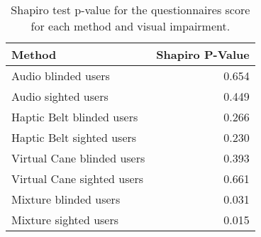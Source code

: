 
\begin{table}[!htb]
\centering
\caption{Shapiro test p-value for the questionnaires score for each method and visual impairment.}
\label{tab:shapiro_questionnaires}
\begin{tabular}{lr}
\toprule
                    Method &  Shapiro P-Value \\
\midrule
       Audio blinded users &            0.654 \\
       Audio sighted users &            0.449 \\
 Haptic Belt blinded users &            0.266 \\
 Haptic Belt sighted users &            0.230 \\
Virtual Cane blinded users &            0.393 \\
Virtual Cane sighted users &            0.661 \\
     Mixture blinded users &            0.031 \\
     Mixture sighted users &            0.015 \\
\bottomrule
\end{tabular}
\end{table}

